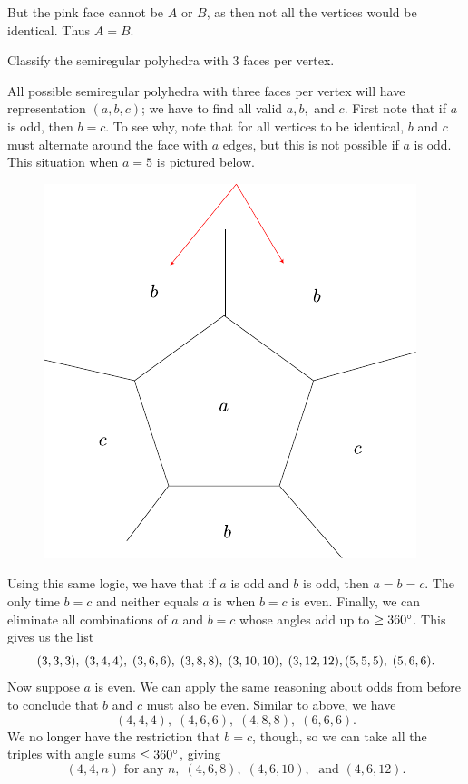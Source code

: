 \documentclass[twoside,10pt]{article}
\begin{document}
But the pink face cannot be $A$ or $B$, as then not all the vertices would be identical. Thus $A = B$.

\newpage

\begin{exer}[5.25]
Classify the semiregular polyhedra with 3 faces per vertex.
\end{exer}

All possible semiregular polyhedra with three faces per vertex will have representation $(a,b,c)$; we have to find all valid $a,b,$ and $c$. First note that if $a$ is odd, then $b=c$. To see why, note that for all vertices to be identical, $b$ and $c$ must alternate around the face with $a$ edges, but this is not possible if $a$ is odd. This situation when $a=5$ is pictured below.

\begin{figure}[H]
	\centering
	\includegraphics[scale=1]{fig/25.pdf}
\end{figure}

Using this same logic, we have that if $a$ is odd and $b$ is odd, then $a=b=c$. The only time $b=c$ and neither equals $a$ is when $b=c$ is even. Finally, we can eliminate all combinations of $a$ and $b=c$ whose angles add up to $\geq 360^\circ$. This gives us the list
\[
	(3,3,3), \; (3,4,4), \; (3,6,6),\;(3,8,8),\;(3,10,10),\;(3,12,12),\\
	(5,5,5),\;(5,6,6).
\] 
Now suppose $a$ is even. We can apply the same reasoning about odds from before to conclude that $b$ and $c$ must also be even. Similar to above, we have
\[
	(4,4,4),\;(4,6,6),\;(4,8,8),\;(6,6,6).
\] We no longer have the restriction that $b=c$, though, so we can take all the triples with angle sums $\leq 360^\circ$, giving
\[
	(4,4,n) \text{ for any } n,\; (4,6,8),\; (4,6,10),\; \text{ and } (4,6,12).
\] 
\end{document}

